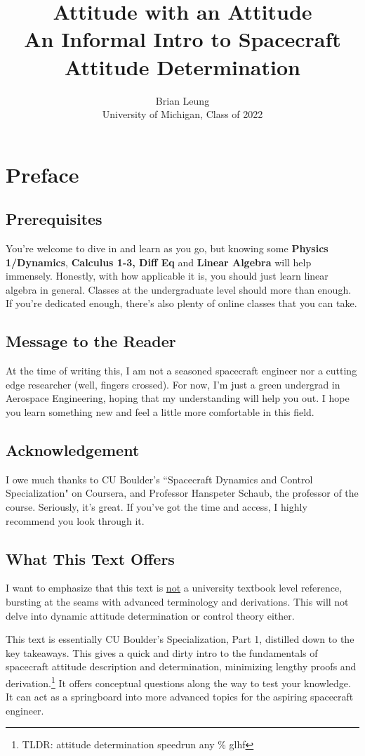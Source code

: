 \documentclass[a4paper,14pt]{extreport}
\title{Attitude with an Attitude \\
\large An Informal Intro to Spacecraft Attitude Determination}
\author{Brian Leung\\University of Michigan, Class of 2022}
\begin{document}
\maketitle
\setcounter{tocdepth}{0}
\tableofcontents{}
\chapter{Preface}
\section{Prerequisites}
You're welcome to dive in and learn as you go, but knowing some \textbf{Physics 1/Dynamics}, \textbf{Calculus 1-3, Diff Eq} and \textbf{Linear Algebra} will help immensely. Honestly, with how applicable it is, you should just learn linear algebra in general. Classes at the undergraduate level should more than enough. If you're dedicated enough, there's also plenty of online classes that you can take.

\section{Message to the Reader}
At the time of writing this, I am not a seasoned spacecraft engineer nor a cutting edge researcher (well, fingers crossed). For now, I'm just a green undergrad in Aerospace Engineering, hoping that my understanding  will help you out. I hope you learn something new and feel a little more comfortable in this field.

\section{Acknowledgement}
I owe much thanks to CU Boulder's ``Spacecraft Dynamics and Control Specialization" on Coursera, and Professor Hanspeter Schaub, the professor of the course. Seriously, it's great. If you've got the time and access, I highly recommend you look through it.

\section{What This Text Offers}
I want to emphasize that this text is \underline{not} a university textbook level reference, bursting at the seams with advanced terminology and derivations. This will not delve into dynamic attitude determination or control theory either. 

This text is essentially CU Boulder's Specialization, Part 1, distilled down to the key takeaways. This gives a quick and dirty intro to the fundamentals of spacecraft attitude description and determination, minimizing lengthy proofs and derivation.\footnote{TLDR: attitude determination speedrun any \% glhf} It offers conceptual questions along the way to test your knowledge. It can act as a springboard into more advanced topics for the aspiring spacecraft engineer.
\end{document}
